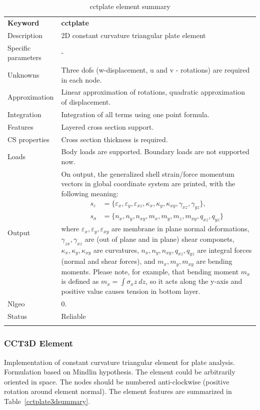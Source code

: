 \documentclass[a4paper]{article}
\newcommand{\param}[1]{\texttt{#1}} %
\newcommand{\templabel}{}%
\newcommand{\tempcaption}{}%
\newcounter{nelpar}
\newenvironment{elementsummary}[5]{%
  \gdef\tempcaption{#4}%
  \gdef\templabel{#5}%
  \setcounter{nelpar}{0}%
  \begin{center} %
    \begin{table}[!htb] %
      \begin{tabular}{|l|p{9cm}|}\hline %
        {\bf Keyword} & \bf{#1}\\ %
        {Description} & {#2}\\ %
        {Specific parameters} & {#3}\\ \hline %
}{
  \\ \hline %
      \end{tabular}%
      \caption{\tempcaption}%
      \label{\templabel}%
    \end{table}%
  \end{center}%
}
\newcommand{\elementParam}[1]{%
  \ifthenelse{\value{nelpar}>0} %
             {&{#1}}%
             {\setcounter{nelpar}{1}Parameters&{#1}}%
             \\%
}
\newcommand{\elementDescription}[2]{{#1} & {#2}\\}
\begin{document}
\begin{elementsummary}{cctplate}{2D constant curvature triangular plate element}{-}{cctplate element summary}{cctplatesummary}
\elementDescription{Unknowns}{Three dofs (w-displacement, u and v - rotations) are required in each node.}
\elementDescription{Approximation}{Linear approximation of rotations, quadratic approximation of displacement.}
\elementDescription{Integration}{Integration of all terms using one point formula.}
\elementDescription{Features}{Layered cross section support.}
\elementDescription{CS properties}{Cross section thickness is required.}
\elementDescription{Loads}{Body loads are supported. Boundary loads are not supported now.}
\elementDescription{Output}{On output, the generalized shell strain/force momentum vectors in global coordinate system are printed, with the following meaning:
\begin{align*}
s_{\varepsilon} &=\{\varepsilon_x, \varepsilon_y, \varepsilon_{xz}, \kappa_x, \kappa_y, \kappa_{xy}, \gamma_{xz}, \gamma_{yz}\},\\
s_{\sigma} &=\{n_x, n_y, n_{xy}, m_x, m_y, m_z, m_{xy}, q_{xz}, q_{yz}\}
\end{align*}
where $\varepsilon_x, \varepsilon_y, \varepsilon_{xy}$ are membrane in plane normal deformations, $\gamma_{zx}, \gamma_{xz}$ are (out of plane and in plane) shear componets, $\kappa_x, \kappa_y, \kappa_{xy}$ are curvatures, $n_x, n_y, n_{xy}, q_{xz}, q_{yz}$ are integral forces (normal and shear forces), and $m_x, m_y, m_{xy}$ are bending moments. 
Please note, for example, that bending moment $m_x$ is defined as $m_x=\int \sigma_x z\ dz$, so it acts along the y-axis and positive value causes tension in bottom layer.}
\elementDescription{Nlgeo}{0.}
\elementDescription{Status}{Reliable}
\end{elementsummary}


\subsubsection {CCT3D Element}
Implementation of constant curvature triangular element for plate
analysis. Formulation based on Mindlin hypothesis. The element could be arbitrarily oriented in space. 
The nodes should be numbered anti-clockwise (positive rotation around element normal). 
The element features are summarized in Table~\ref{cctplate3dsummary}.
\end{document}
